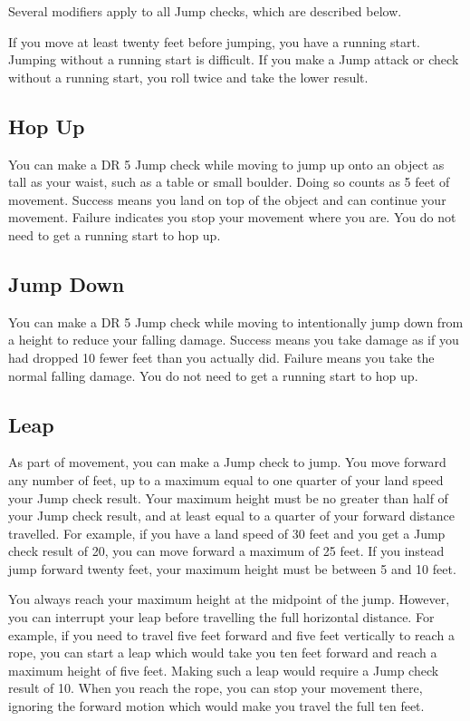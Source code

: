         Several modifiers apply to all Jump checks, which are described below.

        \label{Running Start} If you move at least twenty feet before jumping, you have a running start.
        Jumping without a running start is difficult.
        If you make a Jump attack or check without a running start, you roll twice and take the lower result.

    \subsection{Hop Up}
        You can make a DR 5 Jump check while moving to jump up onto an object as tall as your waist, such as a table or small boulder. Doing so counts as 5 feet of movement. Success means you land on top of the object and can continue your movement. Failure indicates you stop your movement where you are. You do not need to get a running start to hop up.

    \subsection{Jump Down}
        You can make a DR 5 Jump check while moving to intentionally jump down from a height to reduce your falling damage. Success means you take damage as if you had dropped 10 fewer feet than you actually did. Failure means you take the normal falling damage. You do not need to get a running start to hop up.

    \subsection{Leap}\label{Leap}
        As part of movement, you can make a Jump check to jump.
        You move forward any number of feet, up to a maximum equal to one quarter of your land speed \add your Jump check result.
        Your maximum height must be no greater than half of your Jump check result, and at least equal to a quarter of your forward distance travelled.
        For example, if you have a land speed of 30 feet and you get a Jump check result of 20, you can move forward a maximum of 25 feet.
        If you instead jump forward twenty feet, your maximum height must be between 5 and 10 feet.

        You always reach your maximum height at the midpoint of the jump.
        However, you can interrupt your leap before travelling the full horizontal distance.
        For example, if you need to travel five feet forward and five feet vertically to reach a rope, you can start a leap which would take you ten feet forward and reach a maximum height of five feet.
        Making such a leap would require a Jump check result of 10.
        When you reach the rope, you can stop your movement there, ignoring the forward motion which would make you travel the full ten feet.

